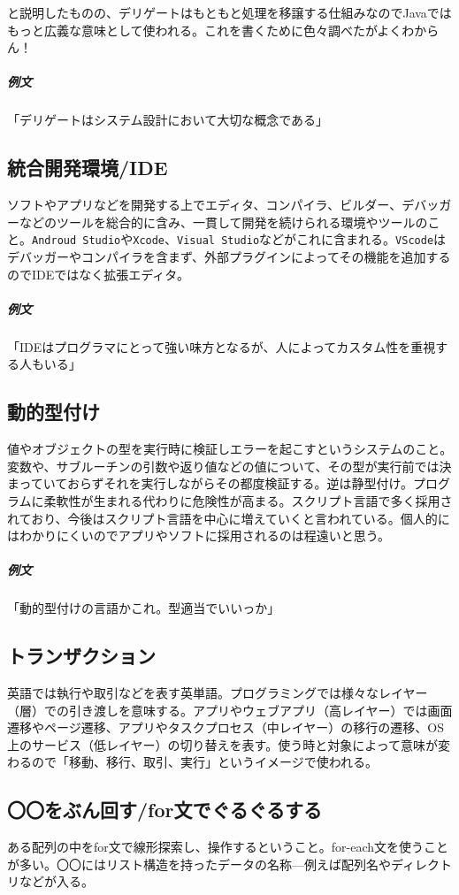 \documentclass[a4paper]{ltjsreport}
\newcommand{\terlogy}[2][|]{\colorbox{terlogy}{\texttt{\lstinline#1#2#1}}}
\begin{document}
と説明したものの、デリゲートはもともと処理を移譲する仕組みなのでJavaではもっと広義な意味として使われる。これを書くために色々調べたがよくわからん！

\subparagraph{例文}「デリゲートはシステム設計において大切な概念である」

\subsection{統合開発環境/IDE}
ソフトやアプリなどを開発する上でエディタ、コンパイラ、ビルダー、デバッガーなどのツールを総合的に含み、一貫して開発を続けられる環境やツールのこと。\terlogy{Androud Studio}や\terlogy{Xcode}、\terlogy{Visual Studio}などがこれに含まれる。\terlogy{VScode}はデバッガーやコンパイラを含まず、外部プラグインによってその機能を追加するのでIDEではなく拡張エディタ。

\subparagraph{例文}「IDEはプログラマにとって強い味方となるが、人によってカスタム性を重視する人もいる」

\subsection{動的型付け}
値やオブジェクトの型を実行時に検証しエラーを起こすというシステムのこと。変数や、サブルーチンの引数や返り値などの値について、その型が実行前では決まっていておらずそれを実行しながらその都度検証する。逆は静型付け。プログラムに柔軟性が生まれる代わりに危険性が高まる。スクリプト言語で多く採用されており、今後はスクリプト言語を中心に増えていくと言われている。個人的にはわかりにくいのでアプリやソフトに採用されるのは程遠いと思う。

\subparagraph{例文}「動的型付けの言語かこれ。型適当でいいっか」

\subsection{トランザクション}
英語では執行や取引などを表す英単語。プログラミングでは様々なレイヤー（層）での引き渡しを意味する。アプリやウェブアプリ（高レイヤー）では画面遷移やページ遷移、アプリやタスクプロセス（中レイヤー）の移行の遷移、OS上のサービス（低レイヤー）の切り替えを表す。使う時と対象によって意味が変わるので「移動、移行、取引、実行」というイメージで使われる。

\subsection{〇〇をぶん回す/for文でぐるぐるする}
ある配列の中をfor文で線形探索し、操作するということ。for-each文を使うことが多い。〇〇にはリスト構造を持ったデータの名称---例えば配列名やディレクトリなどが入る。
\end{document}
